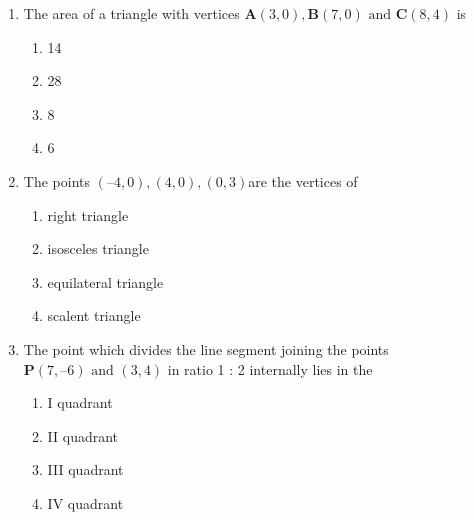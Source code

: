 \documentclass[12pt]{article}
\let\vec\mathbf
\begin{document}
\begin{enumerate}
\begin{enumerate}
\item5
\item 12
\item 11
\item 7
\end{enumerate}
\item The area of a triangle with vertices $\vec{A}(3, 0), \vec{B}(7, 0) \text{ and } \vec{C}(8, 4)$ is
\begin{enumerate}

\item 14
\item 28
\item 8
\item 6
\end{enumerate}
\item The points $ (–4, 0), (4, 0), (0, 3) $are the vertices of
	\begin{enumerate}
\item right triangle 
\item isosceles triangle
\item  equilateral triangle
\item  scalent triangle 
\end{enumerate}
\item The point which divides the line segment joining the points $\vec{P} (7, –6) \text{ and } (3, 4)$ in
ratio 1 : 2 internally lies in the
\begin{enumerate}

\item I quadrant

\item  II quadrant

\item  III quadrant

\item  IV quadrant
\end{enumerate}


\end{enumerate}
\end{document}
